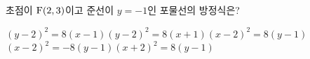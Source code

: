 초점이 $\mathrm{F}(2{,}\mkern3mu\mathopen{}3)$이고 준선이 $y=-1$인 포물선의 방정식은?
\begin{choicesii}{$(y-2)^2=8(x-1)$}{$(y-2)^2=8(x+1)$}{$(x-2)^2=8(y-1)$}{$(x-2)^2=-8(y-1)$}{$(x+2)^2=8(y-1)$}\end{choicesii}
